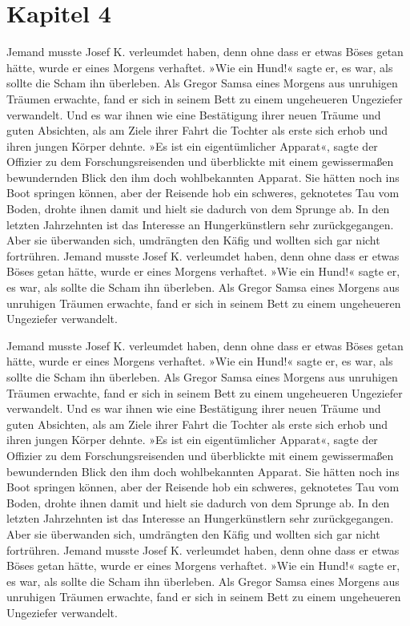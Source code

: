 \chapter{Kapitel 4}
\label{chap:kapitel4}

Jemand musste Josef K. verleumdet haben, denn ohne dass er etwas Böses
getan hätte, wurde er eines Morgens verhaftet. »Wie ein Hund!« sagte er,
es war, als sollte die Scham ihn überleben. Als Gregor Samsa eines
Morgens aus unruhigen Träumen erwachte, fand er sich in seinem Bett zu
einem ungeheueren Ungeziefer verwandelt. Und es war ihnen wie eine
Bestätigung ihrer neuen Träume und guten Absichten, als am Ziele ihrer
Fahrt die Tochter als erste sich erhob und ihren jungen Körper dehnte.
»Es ist ein eigentümlicher Apparat«, sagte der Offizier zu dem
Forschungsreisenden und überblickte mit einem gewissermaßen bewundernden
Blick den ihm doch wohlbekannten Apparat. Sie hätten noch ins Boot
springen können, aber der Reisende hob ein schweres, geknotetes Tau vom
Boden, drohte ihnen damit und hielt sie dadurch von dem Sprunge ab. In
den letzten Jahrzehnten ist das Interesse an Hungerkünstlern sehr
zurückgegangen. Aber sie überwanden sich, umdrängten den Käfig und
wollten sich gar nicht fortrühren. Jemand musste Josef K. verleumdet
haben, denn ohne dass er etwas Böses getan hätte, wurde er eines Morgens
verhaftet. »Wie ein Hund!« sagte er, es war, als sollte die Scham ihn
überleben. Als Gregor Samsa eines Morgens aus unruhigen Träumen
erwachte, fand er sich in seinem Bett zu einem ungeheueren Ungeziefer
verwandelt.


Jemand musste Josef K. verleumdet haben, denn ohne dass er etwas Böses
getan hätte, wurde er eines Morgens verhaftet. »Wie ein Hund!« sagte er,
es war, als sollte die Scham ihn überleben. Als Gregor Samsa eines
Morgens aus unruhigen Träumen erwachte, fand er sich in seinem Bett zu
einem ungeheueren Ungeziefer verwandelt. Und es war ihnen wie eine
Bestätigung ihrer neuen Träume und guten Absichten, als am Ziele ihrer
Fahrt die Tochter als erste sich erhob und ihren jungen Körper dehnte.
»Es ist ein eigentümlicher Apparat«, sagte der Offizier zu dem
Forschungsreisenden und überblickte mit einem gewissermaßen bewundernden
Blick den ihm doch wohlbekannten Apparat. Sie hätten noch ins Boot
springen können, aber der Reisende hob ein schweres, geknotetes Tau vom
Boden, drohte ihnen damit und hielt sie dadurch von dem Sprunge ab. In
den letzten Jahrzehnten ist das Interesse an Hungerkünstlern sehr
zurückgegangen. Aber sie überwanden sich, umdrängten den Käfig und
wollten sich gar nicht fortrühren. Jemand musste Josef K. verleumdet
haben, denn ohne dass er etwas Böses getan hätte, wurde er eines Morgens
verhaftet. »Wie ein Hund!« sagte er, es war, als sollte die Scham ihn
überleben. Als Gregor Samsa eines Morgens aus unruhigen Träumen
erwachte, fand er sich in seinem Bett zu einem ungeheueren Ungeziefer
verwandelt.


